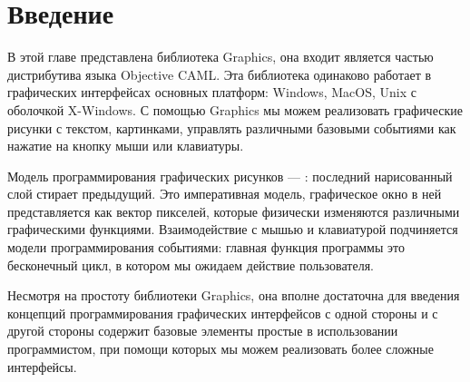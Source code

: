 \section{Введение}
\label{sec:introduction_5}

В этой главе представлена библиотека Graphics, она входит является частью
дистрибутива языка Objective CAML. Эта библиотека одинаково работает в
графических интерфейсах основных платформ: Windows, MacOS, Unix с оболочкой
X-Windows. С помощью Graphics мы можем реализовать графические рисунки с
текстом, картинками, управлять различными базовыми событиями как нажатие на
кнопку мыши или клавиатуры.

Модель программирования графических рисунков --- :
последний нарисованный слой стирает предыдущий. Это императивная модель,
графическое окно в ней представляется как вектор пикселей, которые физически
изменяются различными графическими функциями. Взаимодействие с мышью и
клавиатурой подчиняется модели программирования событиями: главная функция
программы это бесконечный цикл, в котором мы ожидаем действие пользователя.

Несмотря на простоту библиотеки Graphics, она вполне достаточна для введения
концепций программирования графических интерфейсов с одной стороны и с другой
стороны содержит базовые элементы простые в использовании программистом, при
помощи которых мы можем реализовать более сложные интерфейсы.